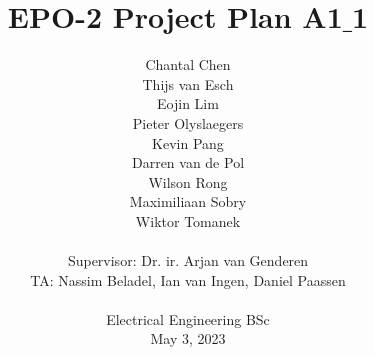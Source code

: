 \documentclass[whitelogo,oneside]{TUD-report2020}
\begin{document}
\frontmatter


\title[tudelft-white]{\Huge{EPO-2 Project Plan A1$\_$1}}
\subtitle[tudelft-black]{}

\author[tudelft-white]{\Large{
Chantal Chen \\ 
Thijs van Esch \\ 
Eojin Lim \\ 
Pieter Olyslaegers \\
Kevin Pang \\ 
Darren van de Pol \\
Wilson Rong \\ 
Maximiliaan Sobry \\ 
Wiktor Tomanek \\ \\
Supervisor: Dr. ir. Arjan van Genderen \\
TA: Nassim Beladel, Ian van Ingen, Daniel Paassen \\ \\
Electrical Engineering BSc\\
May 3, 2023\\}}

%
%
%

  
\end{document}
